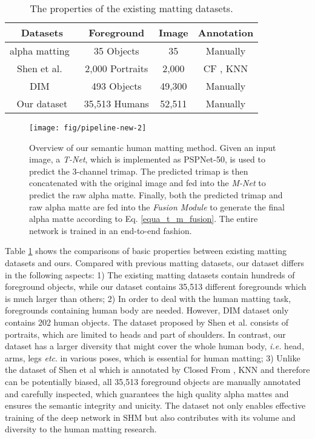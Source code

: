 \newcommand{\tabincell}[2]{\begin{tabular}{@{}#1@{}}#2\end{tabular}}
\begin{table}[t]
\caption{The properties of the existing matting datasets.}
\centering
\begin{tabular}{cccc}
  \toprule
  Datasets & Foreground  & Image & Annotation \\
  \midrule
  alpha matting~\cite{rhemann2009perceptually}    &    35 Objects       &    35   &  Manually \\  
  Shen et al.~\cite{shen2016deep} &  2,000 Portraits       &   2,000    & CF \cite{levin2008closed}, KNN \cite{chen2013knn} \\
DIM~\cite{xu2017deep}  &  493 Objects  &   49,300  & Manually  \\
  Our dataset &  35,513 Humans      & 52,511        & Manually  \\ 
  \bottomrule
\end{tabular}
\label{tab:dataset_components}
\end{table}

\begin{figure*}[hbt]
  \texttt{[image: fig/pipeline-new-2]}
  \caption{Overview of our semantic human matting method.
  	Given an input image, a \emph{T-Net}, which is implemented as PSPNet-50, is used to predict the 3-channel trimap. The predicted trimap is then concatenated with the original image and fed into the \emph{M-Net} to predict the raw alpha matte.
  	Finally, both the predicted trimap and raw alpha matte are fed into the \emph{Fusion Module} to generate the final alpha matte according to Eq. \ref{equa_t_m_fusion}.
  	The entire network is trained in an end-to-end fashion.
}
  \label{pipeline}
\end{figure*}

Table \ref{tab:dataset_components} shows the comparisons of basic properties between existing matting datasets and ours. Compared with previous matting datasets, our dataset differs in the following aspects:
1) The existing matting datasets contain hundreds of foreground objects, while our dataset contains 35,513 different foregrounds which is much larger than others;
2) In order to deal with the human matting task, foregrounds containing human body are needed.
However, DIM\cite{xu2017deep} dataset only contains 202 human objects.
The dataset proposed by Shen et al. \cite{shen2016deep} consists of portraits, which are limited to heads and part of shoulders.
In contrast, our dataset has a larger diversity that might cover the whole human body, \emph{i.e.} head, arms, legs \emph{etc}. in various poses, which is essential for human matting;
3) Unlike the dataset of Shen et al \cite{shen2016deep} which is annotated by Closed From \cite{levin2008closed}, KNN \cite{chen2013knn} and therefore can be potentially biased, all 35,513 foreground objects are manually annotated and carefully inspected, which guarantees the high quality alpha mattes and ensures the semantic integrity and unicity.
The dataset not only enables effective training of the deep network in SHM but also contributes with its volume and diversity to the human matting research.

